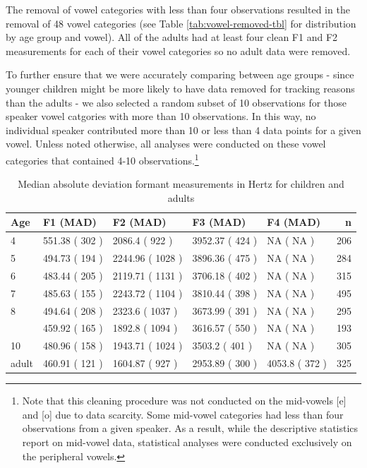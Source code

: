 \documentclass[
]{article}
\begin{document}
The removal of vowel categories with less than four observations resulted in the removal of 48 vowel categories (see Table \ref{tab:vowel-removed-tbl} for distribution by age group and vowel). All of the adults had at least four clean F1 and F2 measurements for each of their vowel categories so no adult data were removed.

To further ensure that we were accurately comparing between age groups - since younger children might be more likely to have data removed for tracking reasons than the adults - we also selected a random subset of 10 observations for those speaker vowel catgories with more than 10 observations. In this way, no individual speaker contributed more than 10 or less than 4 data points for a given vowel. Unless noted otherwise, all analyses were conducted on these vowel categories that contained 4-10 observations.\footnote{Note that this cleaning procedure was not conducted on the mid-vowels {[}e{]} and {[}o{]} due to data scarcity. Some mid-vowel categories had less than four observations from a given speaker. As a result, while the descriptive statistics report on mid-vowel data, statistical analyses were conducted exclusively on the peripheral vowels.}

\begin{table}[!h]

\caption{\label{tab:summary-formant-table}Median absolute deviation formant measurements in Hertz for children and adults}
\centering
\begin{tabular}[t]{lllllr}
\toprule
Age & F1 (MAD) & F2 (MAD) & F3 (MAD) & F4 (MAD) & n\\
\midrule
4 & 551.38 ( 302 ) & 2086.4 ( 922 ) & 3952.37 ( 424 ) & NA ( NA ) & 206\\
5 & 494.73 ( 194 ) & 2244.96 ( 1028 ) & 3896.36 ( 475 ) & NA ( NA ) & 284\\
6 & 483.44 ( 205 ) & 2119.71 ( 1131 ) & 3706.18 ( 402 ) & NA ( NA ) & 315\\
7 & 485.63 ( 155 ) & 2243.72 ( 1104 ) & 3810.44 ( 398 ) & NA ( NA ) & 495\\
8 & 494.64 ( 208 ) & 2323.6 ( 1037 ) & 3673.99 ( 391 ) & NA ( NA ) & 295\\
\addlinespace
9 & 459.92 ( 165 ) & 1892.8 ( 1094 ) & 3616.57 ( 550 ) & NA ( NA ) & 193\\
10 & 480.96 ( 158 ) & 1943.71 ( 1024 ) & 3503.2 ( 401 ) & NA ( NA ) & 305\\
adult & 460.91 ( 121 ) & 1604.87 ( 927 ) & 2953.89 ( 300 ) & 4053.8 ( 372 ) & 325\\
\bottomrule
\end{tabular}
\end{table}
\end{document}

